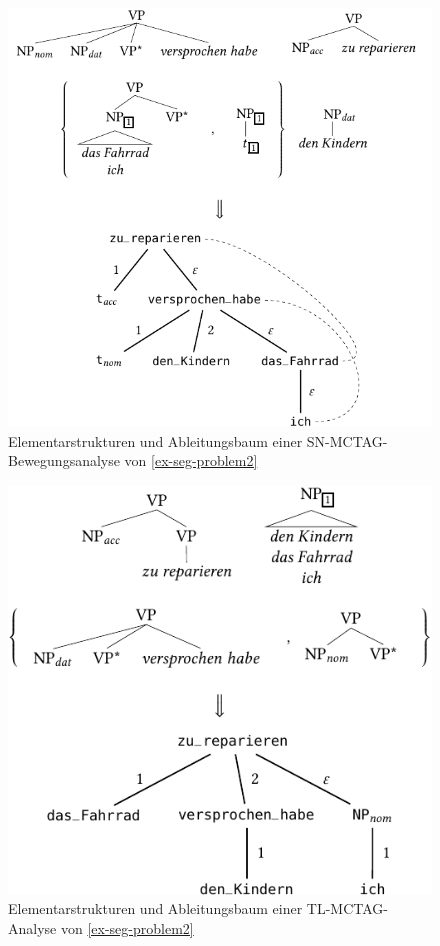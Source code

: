 \begin{figure}[t]
\centering
\includegraphics{graphics/abb615.pdf}
\caption{Elementarstrukturen und Ableitungsbaum einer SN-MCTAG-Bewegungs\-analyse von \ref{ex-seg-problem2}\label{fig-snmctag-1}}
\end{figure}

\begin{figure}[t]
\centering
\includegraphics{graphics/abb616.pdf}
\caption{Elementarstrukturen und Ableitungsbaum einer TL-MCTAG-Analyse von \ref{ex-seg-problem2}\label{fig-snmctag-2}}
\end{figure}

